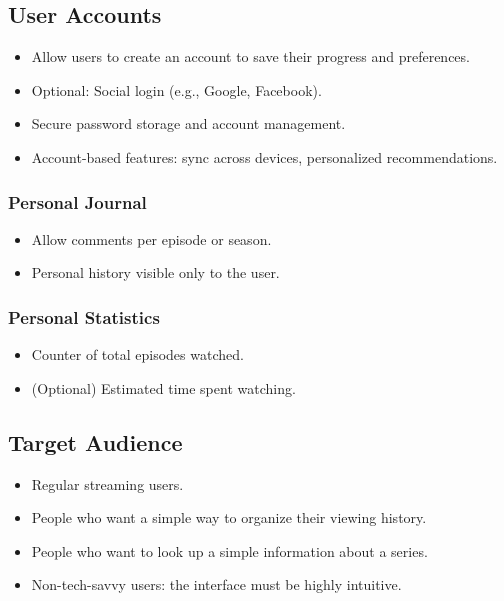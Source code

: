 \subsection{User Accounts}
\begin{itemize}
    \item Allow users to create an account to save their progress and preferences.
    \item Optional: Social login (e.g., Google, Facebook).
    \item Secure password storage and account management.
    \item Account-based features: sync across devices, personalized recommendations.
\end{itemize}

\subsubsection{Personal Journal}
\begin{itemize}
    \item Allow comments per episode or season.
    \item Personal history visible only to the user.
\end{itemize}

\subsubsection{Personal Statistics}
\begin{itemize}
    \item Counter of total episodes watched.
    \item (Optional) Estimated time spent watching.
\end{itemize}

\subsection{Target Audience}
\begin{itemize}
    \item Regular streaming users.
    \item People who want a simple way to organize their viewing history.
    \item People who want to look up a simple information about a series.
    \item Non-tech-savvy users: the interface must be highly intuitive.
\end{itemize}

